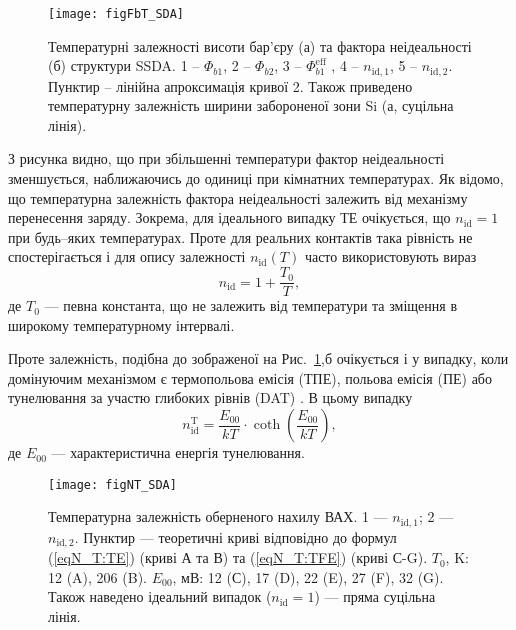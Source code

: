 

\begin{figure}
\center
\texttt{[image: figFbT\_SDA]}
\caption{\label{figFbT_SDA}
Температурні залежності висоти бар'єру (а) та фактора неідеальності (б) структури SSDA.
1 -- $\Phi_{b1}$,
2 -- $\Phi_{b2}$,
3 -- $\Phi_{b1}^\mathrm{eff}$ ,
4 -- $n_{\mathrm{id},1}$, 5 -- $n_{\mathrm{id},2}$.
Пунктир -- лінійна апроксимація кривої 2.
Також приведено температурну залежність ширини забороненої зони Si (а, суцільна лінія).
}%
\end{figure}

З рисунка видно, що при збільшенні температури фактор неідеальності зменшується, наближаючись
до одиниці при кімнатних температурах.
Як відомо, що температурна залежність фактора неідеальності залежить від механізму перенесення заряду.
Зокрема, для ідеального випадку ТЕ очікується, що $n_{\mathrm{id}}=1$ при будь--яких температурах.
Проте для реальних контактів така рівність не спостерігається і для опису залежності $n_{\mathrm{id}}(T)$
часто використовують вираз \cite{Rhoderick1988, Sze2012}
\begin{equation}\label{eqN_T:TE}
n_{\mathrm{id}}=1+\frac{T_0}{T},
\end{equation}
де $T_0$ --- певна константа, що не залежить від температури та зміщення в широкому температурному інтервалі.

Проте залежність, подібна до зображеної на Рис.~\ref{figFbT_SDA},б очікується
і у випадку, коли домінуючим механізмом є термопольова  емісія (ТПЕ), польова емісія (ПЕ) або тунелювання за участю глибоких рівнів (DAT)
\cite{Rhoderick1988,Evstropov,Soylu,JYOTHI2015,OZAVCI2013,Abhishek}.
В цьому випадку
\begin{equation}\label{eqN_T:TFE}
n_{\mathrm{id}}^\mathrm{T}=\frac{E_{00}}{kT}\cdot\coth\left(\frac{E_{00}}{kT}\right),
\end{equation}
де $E_{00}$ --- характеристична енергія тунелювання.


\begin{figure}
\center
\texttt{[image: figNT\_SDA]}
\caption{\label{figNT_SDA}
Температурна залежність оберненого нахилу ВАХ.
1 --- $n_{\mathrm{id},1}$;
2 --- $n_{\mathrm{id},2}$.
Пунктир --- теоретичні криві відповідно до формул (\ref{eqN_T:TE}) (криві А та В)
та (\ref{eqN_T:TFE}) (криві С-G).
$T_0$, K: 12 (A), 206 (B).
$E_{00}$, мВ: 12 (С), 17 (D), 22 (E), 27 (F), 32 (G).
Також наведено ідеальний випадок ($n_{\mathrm{id}}=1$) --- пряма суцільна лінія.
}%
\end{figure}

